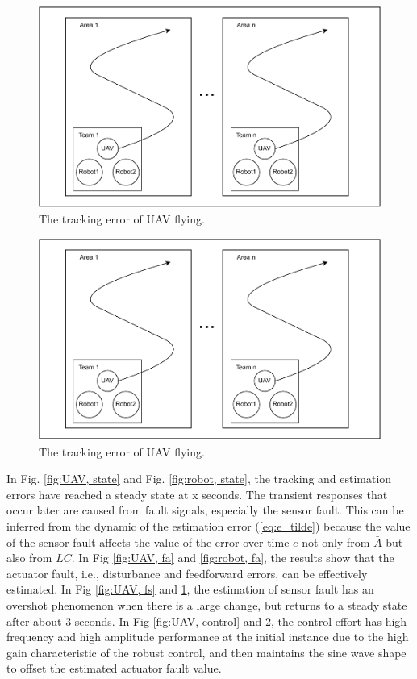 \documentclass{ieeeaccess}
\begin{document}
\begin{figure}[htbp]
    \centering
    \includegraphics[scale=.42]{fig/1.pdf}\caption{The tracking error of UAV flying.}%
    \label{fig:robot, fs}
\end{figure}
\begin{figure}[htbp]
    \centering
    \includegraphics[scale=.42]{fig/1.pdf}\caption{The tracking error of UAV flying.}%
    \label{fig:robot, control}
\end{figure}

In Fig. \ref{fig:UAV, state} and Fig. \ref{fig:robot, state}, the tracking and estimation errors have reached a steady state at x seconds. The transient responses that occur later are caused from fault signals, especially the sensor fault. This can be inferred from the dynamic of the estimation error (\ref{eq:e_tilde}) because the value of the sensor fault affects the value of the error over time $\dot{e}$ not only from $\bar{A}$ but also from $L\bar{C}$. In Fig \ref{fig:UAV, fa} and \ref{fig:robot, fa}, the results show that the actuator fault, i.e., disturbance and feedforward errors, can be effectively estimated. In Fig \ref{fig:UAV, fs} and \ref{fig:robot, fs}, the estimation of sensor fault has an overshot phenomenon when there is a large change, but returns to a steady state after about $3$ seconds. In Fig \ref{fig:UAV, control} and \ref{fig:robot, control}, the control effort has high frequency and high amplitude performance at the initial instance due to the high gain characteristic of the robust control, and then maintains the sine wave shape to offset the estimated actuator fault value.
\end{document}
